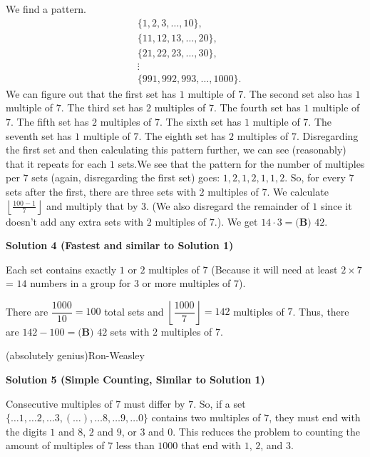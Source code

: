 \begin{enumerate}
We find a pattern. 
 \begin{align*} &\{1,2,3,\ldots,10\}, \\ &\{11,12,13,\ldots,20\},\\ &\{21,22,23,\ldots,30\},\\ &\vdots\\ &\{991,992,993,\ldots,1000\}. \end{align*}
We can figure out that the first set has $1$ multiple of $7$. The second set also has $1$ multiple of $7$. The third set has $2$ multiples of $7$. The fourth set has $1$ multiple of $7$. The fifth set has $2$ multiples of $7$. The sixth set has $1$ multiple of $7$. The seventh set has $1$ multiple of $7$. The eighth set has $2$ multiples of $7$. Disregarding the first set and then calculating this pattern further, we can see (reasonably) that it repeats for each $1$ sets.We see that the pattern for the number of multiples per $7$ sets (again, disregarding the first set) goes: $1,2,1,2,1,1,2.$ So, for every $7$ sets after the first, there are three sets with $2$ multiples of $7$. We calculate $\left\lfloor\frac{100-1}{7}\right\rfloor$ and multiply that by $3$. (We also disregard the remainder of $1$ since it doesn't add any extra sets with $2$ multiples of $7$.). We get $14\cdot3= \boxed{\textbf{(B) }42}$.

 



\textbf{Solution 4 (Fastest and similar to Solution 1)}

Each set contains exactly $1$ or $2$ multiples of $7$ (Because it will need at least $2\times7$ = $14$ numbers in a group for $3$ or more multiples of $7$).

 There are $\dfrac{1000}{10}=100$ total sets and $\left\lfloor\dfrac{1000}{7}\right\rfloor = 142$ multiples of $7$. Thus, there are $142-100=\boxed{\textbf{(B) }42}$ sets with $2$ multiples of $7$.

 (absolutely genius)Ron-Weasley

 



\textbf{Solution 5 (Simple Counting, Similar to Solution 1)}

Consecutive multiples of $7$ must differ by $7$. So, if a set $\{\ldots1,\ldots2,\ldots3,(\ldots),\ldots8,\ldots9,\ldots0\}$ contains two multiples of $7$, they must end with the digits $1$ and $8$, $2$ and $9$, or $3$ and $0$. This reduces the problem to counting the amount of multiples of $7$ less than $1000$ that end with $1$, $2$, and $3$.


\end{enumerate}
